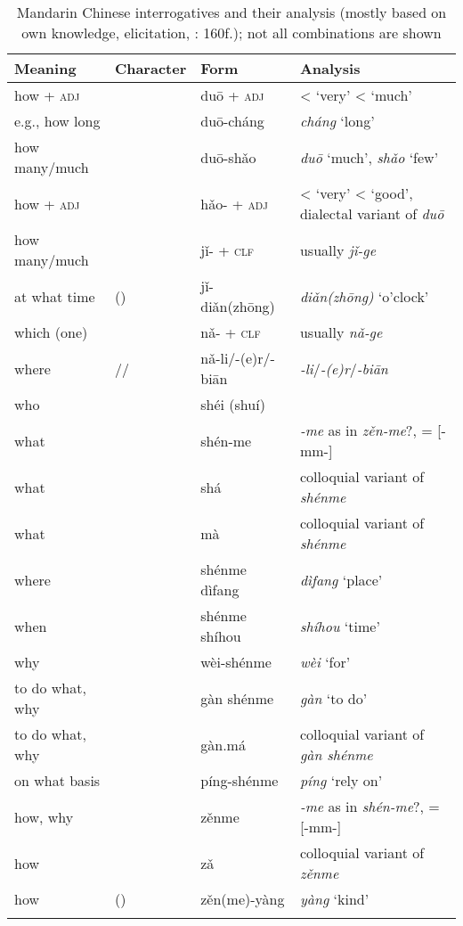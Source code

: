 \begin{table}
\caption{Mandarin Chinese interrogatives and their analysis (mostly based on own knowledge, elicitation, \citealt{Ross2006}: 160f.); not all combinations are shown}
\label{tab:trans:5}

\begin{tabularx}{\textwidth}{lllQ}
\lsptoprule

\textbf{Meaning} & \textbf{Character} & \textbf{Form} & \textbf{Analysis}\\
\midrule
how + \textsc{adj} &  & duō + \textsc{adj} & < ‘very’ < ‘much’\\
e.g., how long &  & duō-cháng & \textit{cháng} ‘long’\\
how many/much &  & duō-shǎo & \textit{duō} ‘much’, \textit{shǎo} ‘few’\\
how + \textsc{adj} &  & hǎo- + \textsc{adj} & < ‘very’ < ‘good’, dialectal variant of \textit{duō}\\
how many/much &  & jǐ- + \textsc{clf} & usually \textit{jǐ-ge} \\
at what time & () & jǐ-diǎn(zhōng) & \textit{diǎn(zhōng)} ‘o’clock’\\
which (one) &  & nǎ- + \textsc{clf} & usually \textit{nǎ-ge} \\
where & // & nǎ-li/-(e)r/-biān & \textit{-li}/\textit{-(e)r}/\textit{-biān}\\
who &  & shéi (shuí) & \\
what &  & shén-me & \textit{-me} as in \textit{zěn-me}?, = [-mm-]\\
what &  & shá & colloquial variant of \textit{shénme}\\
what &  & mà & colloquial variant of \textit{shénme}\\
where &  & shénme dìfang & \textit{dìfang} ‘place’\\
when &  & shénme shíhou & \textit{shíhou} ‘time’\\
why &  & wèi-shénme & \textit{wèi} ‘for’\\
to do what, why &  & gàn shénme & \textit{gàn} ‘to do’\\
to do what, why &  & gàn.má & colloquial variant of \textit{gàn shénme}\\
on what basis &  & píng-shénme & \textit{píng} ‘rely on’\\
how, why &  & zěnme & \textit{-me} as in \textit{shén-me}?, = [-mm-]\\
how &  & zǎ & colloquial variant of \textit{zěnme}\\
how & () & zěn(me)-yàng & \textit{yàng} ‘kind’\\
\lspbottomrule
\end{tabularx}
\end{table}

